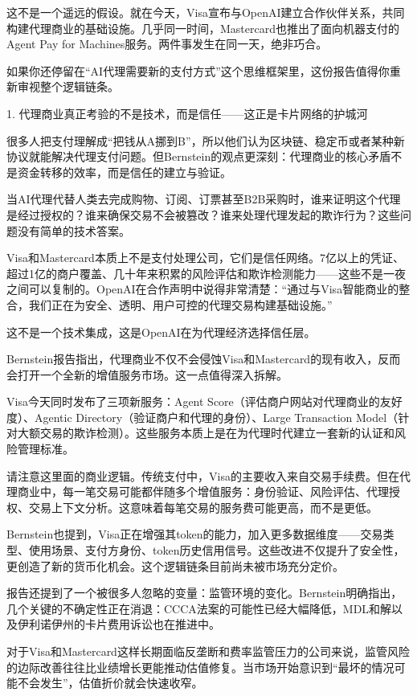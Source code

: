 \documentclass[11pt]{ctexart}
\begin{document}
这不是一个遥远的假设。就在今天，Visa宣布与OpenAI建立合作伙伴关系，共同构建代理商业的基础设施。几乎同一时间，Mastercard也推出了面向机器支付的Agent Pay for Machines服务。两件事发生在同一天，绝非巧合。

如果你还停留在“AI代理需要新的支付方式”这个思维框架里，这份报告值得你重新审视整个逻辑链条。

1. 代理商业真正考验的不是技术，而是信任——这正是卡片网络的护城河

很多人把支付理解成“把钱从A挪到B”，所以他们认为区块链、稳定币或者某种新协议就能解决代理支付问题。但Bernstein的观点更深刻：代理商业的核心矛盾不是资金转移的效率，而是信任的建立与验证。

当AI代理代替人类去完成购物、订阅、订票甚至B2B采购时，谁来证明这个代理是经过授权的？谁来确保交易不会被篡改？谁来处理代理发起的欺诈行为？这些问题没有简单的技术答案。

Visa和Mastercard本质上不是支付处理公司，它们是信任网络。7亿以上的凭证、超过1亿的商户覆盖、几十年来积累的风险评估和欺诈检测能力——这些不是一夜之间可以复制的。OpenAI在合作声明中说得非常清楚：“通过与Visa智能商业的整合，我们正在为安全、透明、用户可控的代理交易构建基础设施。”

这不是一个技术集成，这是OpenAI在为代理经济选择信任层。

Bernstein报告指出，代理商业不仅不会侵蚀Visa和Mastercard的现有收入，反而会打开一个全新的增值服务市场。这一点值得深入拆解。

Visa今天同时发布了三项新服务：Agent Score（评估商户网站对代理商业的友好度）、Agentic Directory（验证商户和代理的身份）、Large Transaction Model（针对大额交易的欺诈检测）。这些服务本质上是在为代理时代建立一套新的认证和风险管理标准。

请注意这里面的商业逻辑。传统支付中，Visa的主要收入来自交易手续费。但在代理商业中，每一笔交易可能都伴随多个增值服务：身份验证、风险评估、代理授权、交易上下文分析。这意味着每笔交易的服务费可能更高，而不是更低。

Bernstein也提到，Visa正在增强其token的能力，加入更多数据维度——交易类型、使用场景、支付方身份、token历史信用信号。这些改进不仅提升了安全性，更创造了新的货币化机会。这个逻辑链条目前尚未被市场充分定价。

报告还提到了一个被很多人忽略的变量：监管环境的变化。Bernstein明确指出，几个关键的不确定性正在消退：CCCA法案的可能性已经大幅降低，MDL和解以及伊利诺伊州的卡片费用诉讼也在推进中。

对于Visa和Mastercard这样长期面临反垄断和费率监管压力的公司来说，监管风险的边际改善往往比业绩增长更能推动估值修复。当市场开始意识到“最坏的情况可能不会发生”，估值折价就会快速收窄。
\end{document}
